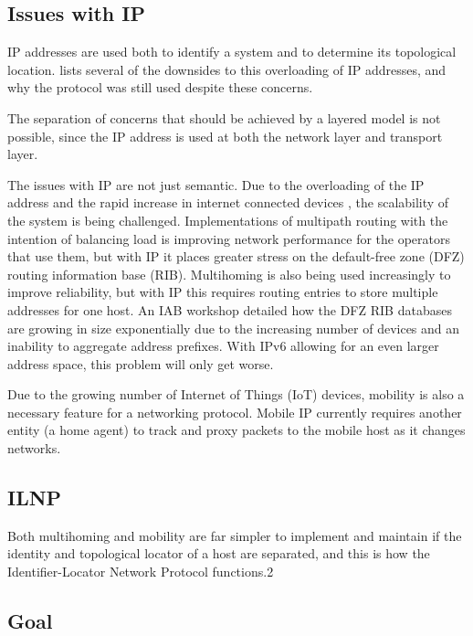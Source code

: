 \documentclass[12pt]{article}
\begin{document}
\subsection{Issues with IP}

IP addresses are used both to identify a system and to determine its topological location. \cite{briancarpenter2014} lists several of the downsides to this overloading of IP addresses, and why the protocol was still used despite these concerns. 


The separation of concerns that should be achieved by a layered model is not possible, since the IP address is used at both the network layer and transport layer. 

The issues with IP are not just semantic. Due to the overloading of the IP address and the rapid increase in internet connected devices \cite{iot_stat}, the scalability of the system is being challenged. Implementations of multipath routing with the intention of balancing load is improving network performance for the operators that use them, but with IP it places greater stress on the default-free zone (DFZ) routing information base (RIB). Multihoming is also being used increasingly to improve reliability, but with IP this requires routing entries to store multiple addresses for one host. An IAB workshop \cite{rfc4984} detailed how the DFZ RIB databases are growing in size exponentially due to the increasing number of devices and an inability to aggregate address prefixes. With IPv6 allowing for an even larger address space, this problem will only get worse. 

Due to the growing number of Internet of Things (IoT) devices, mobility is also a necessary feature for a networking protocol. Mobile IP currently requires another entity (a home agent) to track and proxy packets to the mobile host as it changes networks. 

\subsection{ILNP}

Both multihoming and mobility are far simpler to implement and maintain if the identity and topological locator of a host are separated, and this is how the Identifier-Locator Network Protocol functions.2

\subsection{Goal}
\end{document}
